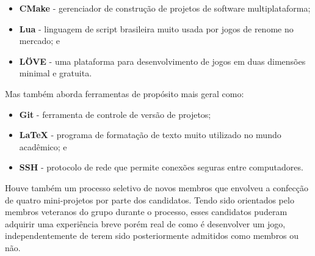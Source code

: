 \documentclass[12pt,onecolumn,a4paper]{article}
\begin{document}
        \begin{itemize}
        
            \item{\bf CMake \footnotemark} - gerenciador de construção de projetos de software
                                             multiplataforma;
            
            \item {\bf Lua \footnotemark} - linguagem de script brasileira muito usada por jogos de
                                            renome no mercado; e

            \item {\bf LÖVE \footnotemark} - uma plataforma para desenvolvimento de jogos em duas
                                             dimensões minimal e gratuita.
            
        \end{itemize}
        
        Mas também aborda ferramentas de propósito mais geral como:
        
        \begin{itemize}
        
            \item {\bf Git \footnotemark} - ferramenta de controle de versão de projetos;
            
            \item {\bf \LaTeX \footnotemark} - programa de formatação de texto muito utilizado no
                                               mundo acadêmico; e
            
            \item {\bf SSH \footnotemark} - protocolo de rede que permite conexões seguras entre
                                            computadores.
        
        \end{itemize}
        
        Houve também um processo seletivo de novos membros que envolveu a confecção de quatro
        mini-projetos por parte dos candidatos. Tendo sido orientados pelo membros veteranos do
        grupo durante o processo, esses candidatos puderam adquirir uma experiência breve porém real
        de como é desenvolver um jogo, independentemente de terem sido posteriormente admitidos como
        membros ou não.
        
\end{document}
